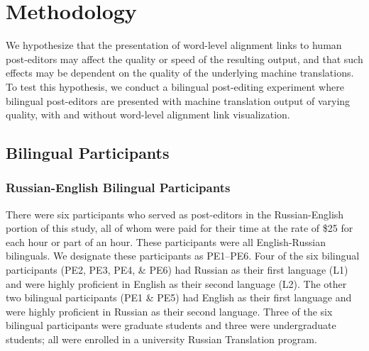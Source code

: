 
\section{Methodology}
\label{sec:methodology}

We hypothesize that the presentation of word-level alignment links to human post-editors may affect the quality or speed of the resulting output, and that such effects may be dependent on the quality of the underlying machine translations.
%
To test this hypothesis, we conduct a bilingual post-editing experiment where bilingual post-editors are presented with machine translation output of varying quality, with and without word-level alignment link visualization. 





\subsection{Bilingual Participants}


\subsubsection{Russian-English Bilingual Participants}
There were six participants who served as post-editors in the Russian-English portion of this study, all of whom were paid for their time at the rate of \$25 for each hour or part of an hour.
%
These participants were all English-Russian bilinguals.
%
We designate these participants as PE1--PE6.
%
Four of the six bilingual participants (PE2, PE3, PE4, \& PE6) had Russian as their first language (L1) and were highly proficient in English as their second language (L2).
%
The other two bilingual participants (PE1 \& PE5) had English as their first language and were highly proficient in Russian as their second language.
%
Three of the six bilingual participants were graduate students and three were undergraduate students; all were enrolled in a university Russian Translation program. %

%

